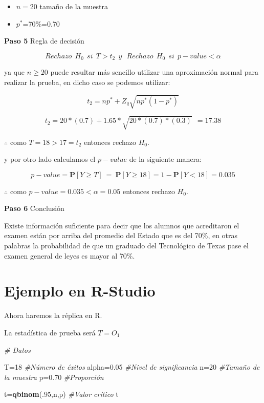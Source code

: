 \documentclass[
  a4paper,
  oneside,
  openany]{book}
\newenvironment{Shaded}{\begin{snugshade}}{\end{snugshade}}
\newcommand{\CommentTok}[1]{\textcolor[rgb]{0.56,0.35,0.01}{\textit{#1}}}
\newcommand{\DecValTok}[1]{\textcolor[rgb]{0.00,0.00,0.81}{#1}}
\newcommand{\FloatTok}[1]{\textcolor[rgb]{0.00,0.00,0.81}{#1}}
\newcommand{\KeywordTok}[1]{\textcolor[rgb]{0.13,0.29,0.53}{\textbf{#1}}}
\newcommand{\NormalTok}[1]{#1}
\begin{document}
\begin{itemize}
\item
  \(n=20\) tamaño de la muestra
\item
  \(p^*\)=70\%=0.70
\end{itemize}

\textbf{Paso 5} Regla de decisión

\[Rechazo \ \  H_0 \ \  si \ \ T>t_{2} \ \  y \ \ \  Rechazo \ \  H_0 \ \ si \ \  p-value<\alpha\]

ya que \(n \geq 20\) puede resultar más sencillo utilizar una aproximación normal para realizar la prueba, en dicho caso se podemos utilizar:

\[t_{2}=np^*+Z_{q}\sqrt{np^*(1-p^*)}\]

\[t_{2}=20*(0.7)+1.65*\sqrt{20*(0.7)*(0.3)} \ \ = 17.38\]

\(\therefore\) como \(T=18>17=t_{2}\) entonces rechazo \(H_0\).

y por otro lado calculamos el \(p-value\) de la siguiente manera:

\[p-value= \mathbf{P}[Y \geq T] \  = \ \mathbf{P}[Y \geq 18]=1-\mathbf{P}[Y < 18]= 0.035\]

\(\therefore\) como \(p-value=0.035<\alpha=0.05\) entonces rechazo \(H_0\).

\textbf{Paso 6} Conclusión

Existe información suficiente para decir que los alumnos que acreditaron el examen están por arriba del promedio del Estado que es del 70\%, en otras palabras la probabilidad de que un graduado del Tecnológico de Texas pase el examen general de leyes es mayor al 70\%.

\hypertarget{ejemplo-en-r-studio}{%
\section{Ejemplo en R-Studio}\label{ejemplo-en-r-studio}}

Ahora haremos la réplica en R.

La estadística de prueba será \(T=O_1\)

\begin{Shaded}
\begin{Highlighting}[]
\CommentTok{\# Datos}

\NormalTok{T=}\DecValTok{18}                                   \CommentTok{\#Número de éxitos}
\NormalTok{alpha=}\FloatTok{0.05}                             \CommentTok{\#Nivel de significancia}
\NormalTok{n=}\DecValTok{20}                                   \CommentTok{\#Tamaño de la muestra}
\NormalTok{p=}\FloatTok{0.70}                                 \CommentTok{\#Proporción  }

\NormalTok{t=}\KeywordTok{qbinom}\NormalTok{(.}\DecValTok{95}\NormalTok{,n,p)                       }\CommentTok{\#Valor crítico}
\NormalTok{t}
\end{Highlighting}
\end{Shaded}
\end{document}

